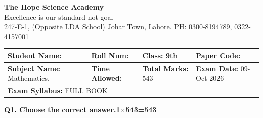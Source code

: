 \documentclass[11pt,a4paper]{article}
\begin{document}
\begin{center}
  {\Huge\bfseries The Hope Science Academy}\\[3pt]
  {\small Excellence is our standard not goal}\\[2pt]
  {\small 247-E-1, (Opposite LDA School) Johar Town, Lahore. PH: 0300-8194789, 0322-4157001}
\end{center}

\medskip
\noindent
\begin{tabularx}{\linewidth}{|X|X|X|X|}
\hline
\textbf{Student Name:} & \textbf{Roll Num:} & \textbf{Class:} 9th & \textbf{Paper Code:} \\ \hline
\textbf{Subject Name:} Mathematics. & \textbf{Time Allowed:} & \textbf{Total Marks:} 543 & \textbf{Exam Date:} 09-Oct-2026 \\ \hline
\multicolumn{4}{|l|}{\textbf{Exam Syllabus:} FULL BOOK} \\ \hline
\end{tabularx}

\bigskip
\noindent\textbf{Q1. Choose the correct answer.}\hfill\textbf{1$\times$543=543}
\end{document}
